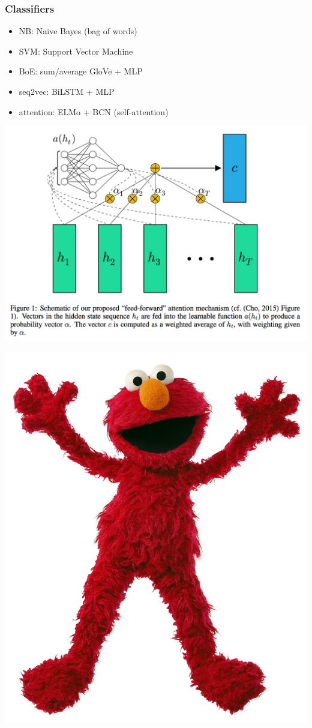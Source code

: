 \documentclass[t,xcolor={svgnames,table},aspectratio=169]{beamer}
\begin{document}
\begin{frame}
	\frametitle{Classifiers}
	\LARGE
	\begin{minipage}{.69\textwidth}
	\begin{itemize}\setlength\itemsep{1em}
		\item NB: Naive Bayes (bag of words)
		\item SVM: Support Vector Machine
		\item BoE: sum/average GloVe + MLP
		\item seq2vec: BiLSTM + MLP
		\item attention: ELMo + BCN (self-attention)
	\end{itemize}
	\end{minipage}
	\begin{minipage}{.29\textwidth}
	\centering
	\hspace{-2cm}\includegraphics[trim={3cm 3cm 3cm 0},clip,width=\textwidth]{FeedForwardAttention.png}
	
	\includegraphics[width=.7\textwidth]{elmo.jpg}
	\end{minipage}
\end{frame}
\end{document}
